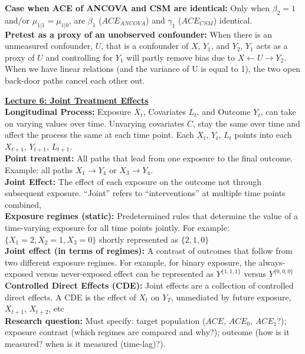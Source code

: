 \documentclass[a4paper,7pt,landscape]{extarticle}
\begin{document}
\begin{multicols}{3}
\begin{boxA}
\textbf{Case when ACE of ANCOVA and CSM are identical:} Only when $\beta_2 = 1$ and/or $\mu_{1|1} = \mu_{1|0}$, are $\beta_1$ ($ACE_{ANCOVA}$) and $\gamma_1$ ($ACE_{CSM}$) identical.\\
\textbf{Pretest as a proxy of an unobserved confounder:} When there is an unmeasured confounder, $U$, that is a confounder of $X$, $Y_1$, and $Y_2$, $Y_1$ acts as a proxy of $U$ and controlling for $Y_1$ will partly remove bias due to $X \leftarrow U \rightarrow Y_2$. When we have linear relations (and the variance of U is equal to 1),  the two open back-door paths cancel each other out.\\    

\end{boxA}

\begin{boxA}
\underline{\textbf{Lecture 6: Joint Treatment Effects}}\\
\textbf{Longitudinal Process:} Exposure $X_t$, Covariates $L_t$, and Outcome $Y_t$, can take on varying values over time. Unvarying covariates $C$, stay the same over time and affect the process the same at each time point. Each $X_t$, $Y_t$, $L_t$ points into each $X_{t+1}$, $Y_{t+1}$, $L_{t+1}$.\\
\textbf{Point treatment:} All paths that lead from one exposure to the final outcome. Example: all paths $X_1 \rightarrow Y_4$ or $X_3 \rightarrow Y_4$.\\
\textbf{Joint Effect:} The effect of each exposure on the outcome not through subsequent exposure. “Joint” refers to “interventions” at multiple time points combined,\\
\textbf{Exposure regimes (static):} Predetermined rules that determine the value of a time-varying exposure for all time points jointly. For example: $\{X_1 = 2, X_2 = 1, X_3 = 0\}$ shortly represented as $\{2, 1, 0\}$\\
\textbf{Joint effect (in terms of regimes):} A contrast of outcomes that follow from two different exposure regimes. For example, for binary exposure, the always-exposed versus never-exposed effect can be represented as $Y^{\{1, 1, 1\}}$ versus $Y^{\{0, 0, 0\}}$\\
\textbf{Controlled Direct Effects (CDE):} Joint effects are a collection of controlled direct effects. A CDE is the effect of $X_t$ on $Y_T$,
unmediated by future exposure, $X_{t+1}$, $X_{t+2}$, etc\\
\textbf{Research question:} Must specify: target population ($ACE$, $ACE_0$, $ACE_1$?); exposure contrast (which regimes are compared and why?); outcome (how is it measured? when is it measured (time-lag)?).\\

\end{boxA}
\end{multicols}
\end{document}
